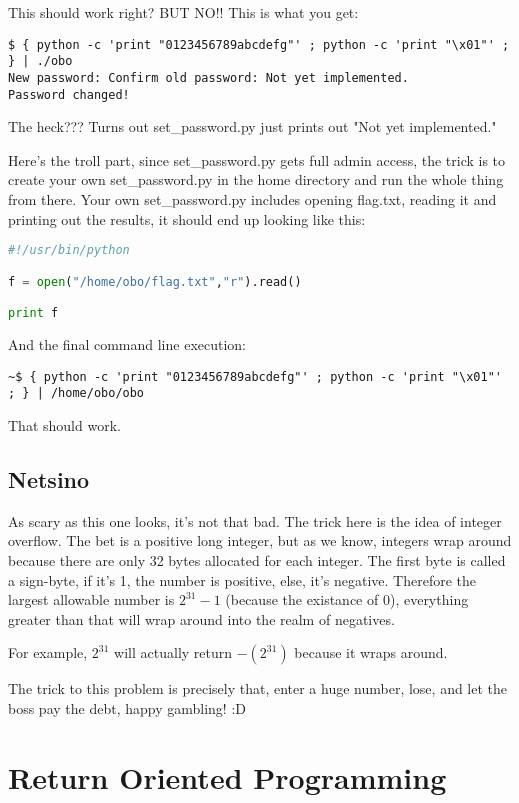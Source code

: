 \documentclass [12 pt, twoside] {article}
\begin{document}
This should work right? BUT NO!! This is what you get:
\begin{lstlisting}
$ { python -c 'print "0123456789abcdefg"' ; python -c 'print "\x01"' ; } | ./obo 
New password: Confirm old password: Not yet implemented.
Password changed!
\end{lstlisting}


The heck??? Turns out set\_password.py just prints out "Not yet implemented."


Here's the troll part, since set\_password.py gets full admin access, the trick
is to create your own set\_password.py in the home directory and run the whole thing
from there. Your own set\_password.py includes opening flag.txt, reading it and
printing out the results, it should end up looking like this:
\begin{lstlisting}[language=python]
#!/usr/bin/python

f = open("/home/obo/flag.txt","r").read()

print f
\end{lstlisting}

And the final command line execution:

\begin{lstlisting}
~$ { python -c 'print "0123456789abcdefg"' ; python -c 'print "\x01"' ; } | /home/obo/obo
\end{lstlisting}

That should work.


\subsection{Netsino}


As scary as this one looks, it's not that bad. The trick here is the idea of integer overflow.
The bet is a positive long integer, but as we know, integers wrap around because there are
only 32 bytes allocated for each integer. The first byte is called a sign-byte, if it's 1,
the number is positive, else, it's negative. Therefore the largest allowable number
is $2^{31} - 1$ (because the existance of 0), everything greater than that will wrap around into the realm of negatives.


For example, $2^{31}$ will actually return $-(2^{31})$ because it wraps around.


The trick to this problem is precisely that, enter a huge number, lose, and let the boss
pay the debt, happy gambling! :D


\section{Return Oriented Programming}
\end{document}
